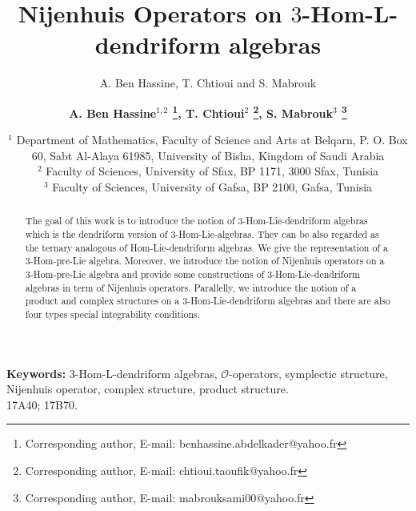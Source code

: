 \documentclass[a4paper,11pt]{article}
\date{}
\theoremstyle{definition}
\begin{document}
\title{Nijenhuis Operators on $3$-Hom-L-dendriform algebras}
\author{A. Ben Hassine, T. Chtioui and  S. Mabrouk}
\author{\normalsize \bf  A. Ben Hassine\small{$^{1,2}$} \footnote { Corresponding author,  E-mail: benhassine.abdelkader@yahoo.fr}, T. Chtioui\small{$^{2}$} \footnote { Corresponding author,  E-mail: chtioui.taoufik@yahoo.fr},  S. Mabrouk\small{$^{3}$} \footnote { Corresponding author,  E-mail: mabrouksami00@yahoo.fr}}
\date{{\small{$^{1}$ Department of Mathematics, Faculty of Science and Arts at
Belqarn, P. O. Box 60, Sabt Al-Alaya 61985, University of Bisha, Kingdom of Saudi Arabia \\  \small{$^{2}$    Faculty of Sciences, University of Sfax,   BP
1171, 3000 Sfax, Tunisia \\  \small{$^{3}$} Faculty of Sciences, University of Gafsa,   BP
2100, Gafsa, Tunisia
 }}}} \maketitle


\maketitle
\begin{abstract}
The goal of this work is to introduce the notion of $3$-Hom-Lie-dendriform algebras which is the dendriform version of $3$-Hom-Lie-algebras. They can be also regarded as the ternary analogous of Hom-Lie-dendriform algebras. We give the representation  of a  $3$-Hom-pre-Lie algebra. Moreover, we introduce the notion of Nijenhuis operators on a $3$-Hom-pre-Lie algebra and provide some constructions of $3$-Hom-Lie-dendriform algebras in term of  Nijenhuis operators. Parallelly, we introduce the notion of a product and complex structures
on a $3$-Hom-Lie-dendriform algebras and there are also four types special integrability conditions.
\end{abstract}



\noindent\textbf{Keywords:} $3$-Hom-L-dendriform algebras, $\mathcal{O}$-operators,  symplectic structure, Nijenhuis operator, complex structure, product structure.\\
  17A40; 17B70.
\tableofcontents
\end{document}
